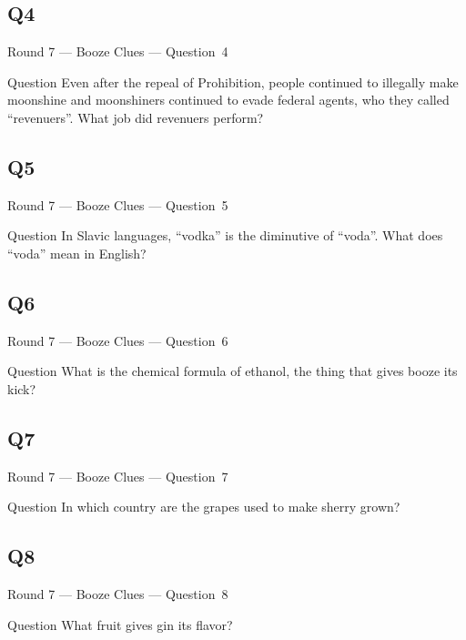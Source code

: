 \documentclass[11pt]{beamer}
\begin{document}
\subsection*{Q4}
\begin{frame}[t]{Round 7 --- Booze Clues --- \mbox{Question 4}}
\vspace{-0.5em}
\begin{block}{Question}
Even after the repeal of Prohibition, people continued to illegally make moonshine and moonshiners continued to evade federal agents, who they called ``revenuers''. What job did revenuers perform?
\end{block}
\end{frame}
\subsection*{Q5}
\begin{frame}[t]{Round 7 --- Booze Clues --- \mbox{Question 5}}
\vspace{-0.5em}
\begin{block}{Question}
In Slavic languages, ``vodka'' is the diminutive of ``voda''. What does ``voda'' mean in English?
\end{block}
\end{frame}
\subsection*{Q6}
\begin{frame}[t]{Round 7 --- Booze Clues --- \mbox{Question 6}}
\vspace{-0.5em}
\begin{block}{Question}
What is the chemical formula of ethanol, the thing that gives booze its kick?
\end{block}
\end{frame}
\subsection*{Q7}
\begin{frame}[t]{Round 7 --- Booze Clues --- \mbox{Question 7}}
\vspace{-0.5em}
\begin{block}{Question}
In which country are the grapes used to make sherry grown?
\end{block}
\end{frame}
\subsection*{Q8}
\begin{frame}[t]{Round 7 --- Booze Clues --- \mbox{Question 8}}
\vspace{-0.5em}
\begin{block}{Question}
What fruit gives gin its flavor?
\end{block}
\end{frame}
\end{document}
